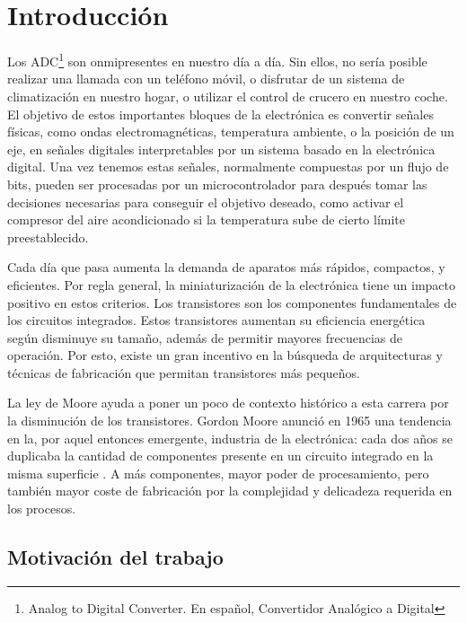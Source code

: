 \documentclass[12pt]{report} %
\begin{document}
\newpage %
\thispagestyle{plain}
\mbox{}

\clearpage
{} %

\chapter{Introducción}

	Los ADC\footnote{Analog to Digital Converter. En español, Convertidor Analógico a Digital} son onmipresentes en nuestro día a día. Sin ellos, no sería posible realizar una llamada con un teléfono móvil, o disfrutar de un sistema de climatización en nuestro hogar, o utilizar el control de crucero en nuestro coche. El objetivo de estos importantes bloques de la electrónica es convertir señales físicas, como ondas electromagnéticas, temperatura ambiente, o la posición de un eje, en señales digitales interpretables por un sistema basado en la electrónica digital. Una vez tenemos estas señales, normalmente compuestas por un flujo de bits, pueden ser procesadas por un microcontrolador para después tomar las decisiones necesarias para conseguir el objetivo deseado, como activar el compresor del aire acondicionado si la temperatura sube de cierto límite preestablecido.
	
	Cada día que pasa aumenta la demanda de aparatos más rápidos, compactos, y eficientes. Por regla general, la miniaturización de la electrónica tiene un impacto positivo en estos criterios. Los transistores son los componentes fundamentales de los circuitos integrados. Estos transistores aumentan su eficiencia energética según disminuye su tamaño, además de permitir mayores frecuencias de operación. Por esto, existe un gran incentivo en la búsqueda de arquitecturas y técnicas de fabricación que permitan transistores más pequeños.
	
	La ley de Moore ayuda a poner un poco de contexto histórico a esta carrera por la disminución de los transistores. Gordon Moore anunció en 1965 una tendencia en la, por aquel entonces emergente, industria de la electrónica: cada dos años se duplicaba la cantidad de componentes presente en un circuito integrado en la misma superficie \cite{moorelaw}. A más componentes, mayor poder de procesamiento, pero también mayor coste de fabricación por la complejidad y delicadeza requerida en los procesos.
	
	\section{Motivación del trabajo}
	
\end{document}
